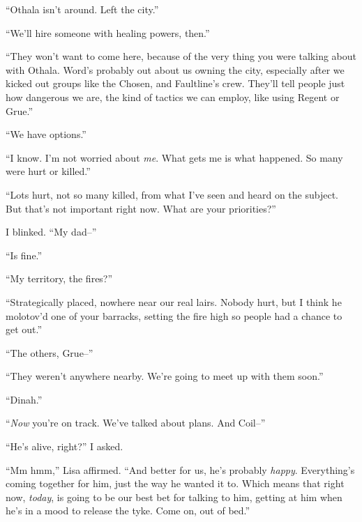 ``Othala isn't around.  Left the city.''



``We'll hire someone with healing powers, then.''



``They won't want to come here, because of the very thing you were talking about with Othala.  Word's probably out about us owning the city, especially after we kicked out groups like the Chosen, and Faultline's crew.  They'll tell people just how dangerous we are, the kind of tactics we can employ, like using Regent or Grue.''



``We have options.''



``I know.  I'm not worried about \emph{me}.  What gets me is what happened.  So many were hurt or killed.''



``Lots hurt, not so many killed, from what I've seen and heard on the subject.  But that's not important right now.  What are your priorities?''



I blinked.  ``My dad--''



``Is fine.''



``My territory, the fires?''



``Strategically placed, nowhere near our real lairs.  Nobody hurt, but I think he molotov'd one of your barracks, setting the fire high so people had a chance to get out.''



``The others, Grue--''



``They weren't anywhere nearby.  We're going to meet up with them soon.''



``Dinah.''



``\emph{Now} you're on track.  We've talked about plans.  And Coil--''



``He's alive, right?'' I asked.



``Mm hmm,'' Lisa affirmed.  ``And better for us, he's probably \emph{happy}.  Everything's coming together for him, just the way he wanted it to.  Which means that right now, \emph{today}, is going to be our best bet for talking to him, getting at him when he's in a mood to release the tyke.  Come on, out of bed.''



